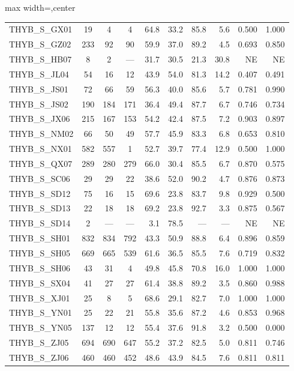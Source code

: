 \begin{responsetable}
\begin{adjustbox}{max width=\textwidth,center}
\begin{tabular}{@{}l *{3}{c} *{6}{r} @{}}
THYB\_S\_GX01 & 19 & 4 & 4 & 64.8 & 33.2 & 85.8 & 5.6 & 0.500 & 1.000 \\
THYB\_S\_GZ02 & 233 & 92 & 90 & 59.9 & 37.0 & 89.2 & 4.5 & 0.693 & 0.850 \\
THYB\_S\_HB07 & 8 & 2 & --- & 31.7 & 30.5 & 21.3 & 30.8 & NE & NE \\
THYB\_S\_JL04 & 54 & 16 & 12 & 43.9 & 54.0 & 81.3 & 14.2 & 0.407 & 0.491 \\
THYB\_S\_JS01 & 72 & 66 & 59 & 56.3 & 40.0 & 85.6 & 5.7 & 0.781 & 0.990 \\
THYB\_S\_JS02 & 190 & 184 & 171 & 36.4 & 49.4 & 87.7 & 6.7 & 0.746 & 0.734 \\
THYB\_S\_JX06 & 215 & 167 & 153 & 54.2 & 42.4 & 87.5 & 7.2 & 0.903 & 0.897 \\
THYB\_S\_NM02 & 66 & 50 & 49 & 57.7 & 45.9 & 83.3 & 6.8 & 0.653 & 0.810 \\
THYB\_S\_NX01 & 582 & 557 & 1 & 52.7 & 39.7 & 77.4 & 12.9 & 0.500 & 1.000 \\
THYB\_S\_QX07 & 289 & 280 & 279 & 66.0 & 30.4 & 85.5 & 6.7 & 0.870 & 0.575 \\
THYB\_S\_SC06 & 29 & 29 & 22 & 38.6 & 52.0 & 90.2 & 4.7 & 0.876 & 0.873 \\
THYB\_S\_SD12 & 75 & 16 & 15 & 69.6 & 23.8 & 83.7 & 9.8 & 0.929 & 0.500 \\
THYB\_S\_SD13 & 22 & 18 & 18 & 69.2 & 23.8 & 92.7 & 3.3 & 0.875 & 0.567 \\
THYB\_S\_SD14 & 2 & --- & --- & 3.1 & 78.5 & --- & --- & NE & NE \\
THYB\_S\_SH01 & 832 & 834 & 792 & 43.3 & 50.9 & 88.8 & 6.4 & 0.896 & 0.859 \\
THYB\_S\_SH05 & 669 & 665 & 539 & 61.6 & 36.5 & 85.5 & 7.6 & 0.719 & 0.832 \\
THYB\_S\_SH06 & 43 & 31 & 4 & 49.8 & 45.8 & 70.8 & 16.0 & 1.000 & 1.000 \\
THYB\_S\_SX04 & 41 & 27 & 27 & 61.4 & 38.8 & 89.2 & 3.5 & 0.860 & 0.988 \\
THYB\_S\_XJ01 & 25 & 8 & 5 & 68.6 & 29.1 & 82.7 & 7.0 & 1.000 & 1.000 \\
THYB\_S\_YN01 & 25 & 22 & 21 & 55.8 & 35.6 & 87.2 & 4.6 & 0.853 & 0.968 \\
THYB\_S\_YN05 & 137 & 12 & 12 & 55.4 & 37.6 & 91.8 & 3.2 & 0.500 & 0.000 \\
THYB\_S\_ZJ05 & 694 & 690 & 647 & 55.2 & 37.2 & 82.5 & 5.0 & 0.811 & 0.746 \\
THYB\_S\_ZJ06 & 460 & 460 & 452 & 48.6 & 43.9 & 84.5 & 7.6 & 0.811 & 0.811 \\

\end{tabular}
\end{adjustbox}
\end{responsetable}
